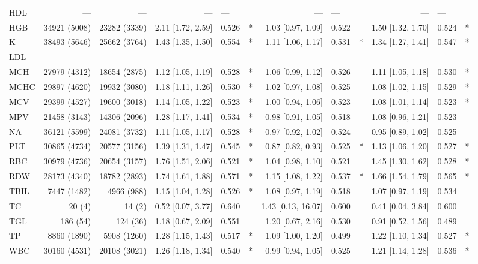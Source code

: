 \begin{table}[ht]
\begin{tabular}{lrrrlcrlcrlc}
HDL & --- & --- & --- & --- &  & --- & --- &  & --- & --- &  \\
HGB & 34921 (5008) & 23282 (3339) & 2.11 [1.72, 2.59] & 0.526 & * & 1.03 [0.97, 1.09] & 0.522 &  & 1.50 [1.32, 1.70] & 0.524 & * \\
K & 38493 (5646) & 25662 (3764) & 1.43 [1.35, 1.50] & 0.554 & * & 1.11 [1.06, 1.17] & 0.531 & * & 1.34 [1.27, 1.41] & 0.547 & * \\
LDL & --- & --- & --- & --- &  & --- & --- &  & --- & --- &  \\
MCH & 27979 (4312) & 18654 (2875) & 1.12 [1.05, 1.19] & 0.528 & * & 1.06 [0.99, 1.12] & 0.526 &  & 1.11 [1.05, 1.18] & 0.530 & * \\
MCHC & 29897 (4620) & 19932 (3080) & 1.18 [1.11, 1.26] & 0.530 & * & 1.02 [0.97, 1.08] & 0.525 &  & 1.08 [1.02, 1.15] & 0.529 & * \\
MCV & 29399 (4527) & 19600 (3018) & 1.14 [1.05, 1.22] & 0.523 & * & 1.00 [0.94, 1.06] & 0.523 &  & 1.08 [1.01, 1.14] & 0.523 & * \\
MPV & 21458 (3143) & 14306 (2096) & 1.28 [1.17, 1.41] & 0.534 & * & 0.98 [0.91, 1.05] & 0.518 &  & 1.08 [0.96, 1.21] & 0.523 &  \\
NA & 36121 (5599) & 24081 (3732) & 1.11 [1.05, 1.17] & 0.528 & * & 0.97 [0.92, 1.02] & 0.524 &  & 0.95 [0.89, 1.02] & 0.525 &  \\
PLT & 30865 (4734) & 20577 (3156) & 1.39 [1.31, 1.47] & 0.545 & * & 0.87 [0.82, 0.93] & 0.525 & * & 1.13 [1.06, 1.20] & 0.527 & * \\
RBC & 30979 (4736) & 20654 (3157) & 1.76 [1.51, 2.06] & 0.521 & * & 1.04 [0.98, 1.10] & 0.521 &  & 1.45 [1.30, 1.62] & 0.528 & * \\
RDW & 28173 (4340) & 18782 (2893) & 1.74 [1.61, 1.88] & 0.571 & * & 1.15 [1.08, 1.22] & 0.537 & * & 1.66 [1.54, 1.79] & 0.565 & * \\
TBIL & 7447 (1482) & 4966 (988) & 1.15 [1.04, 1.28] & 0.526 & * & 1.08 [0.97, 1.19] & 0.518 &  & 1.07 [0.97, 1.19] & 0.534 &  \\
TC & 20 (4) & 14 (2) & 0.52 [0.07, 3.77] & 0.640 &  & 1.43 [0.13, 16.07] & 0.600 &  & 0.41 [0.04, 3.84] & 0.600 &  \\
TGL & 186 (54) & 124 (36) & 1.18 [0.67, 2.09] & 0.551 &  & 1.20 [0.67, 2.16] & 0.530 &  & 0.91 [0.52, 1.56] & 0.489 &  \\
TP & 8860 (1890) & 5908 (1260) & 1.28 [1.15, 1.43] & 0.517 & * & 1.09 [1.00, 1.20] & 0.499 &  & 1.22 [1.10, 1.34] & 0.527 & * \\
WBC & 30160 (4531) & 20108 (3021) & 1.26 [1.18, 1.34] & 0.540 & * & 0.99 [0.94, 1.05] & 0.525 &  & 1.21 [1.14, 1.28] & 0.536 & * \\
\bottomrule
\end{tabular}
\end{table}